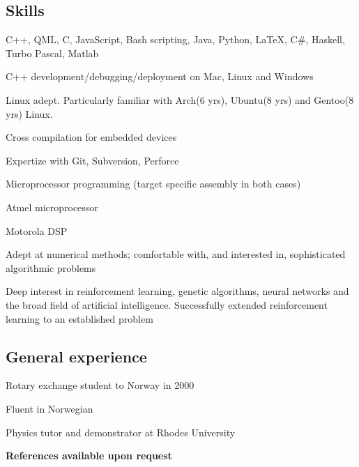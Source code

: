 \documentclass{article}
\begin{document}
\subsection*{Skills}
\begin{itemize*}
\item{ C++, QML, C, JavaScript, Bash scripting, Java, Python, \LaTeX, C\#, Haskell, Turbo Pascal, Matlab}
\item{ C++ development/debugging/deployment on Mac, Linux and Windows}
\item{ Linux adept. Particularly familiar with Arch(6 yrs), Ubuntu(8 yrs) and Gentoo(8 yrs) Linux.}
\item{ Cross compilation for embedded devices}
\item{ Expertize with Git, Subversion, Perforce}
\item{ Microprocessor programming (target specific assembly in both cases) }
\begin{itemize*}
\item{ Atmel microprocessor}
\item{ Motorola DSP}
\end{itemize*}
\item{ Adept at numerical methods; comfortable with, and interested in, sophisticated algorithmic problems}
\item{ Deep interest in reinforcement learning, genetic algorithms, neural networks and the broad field of artificial intelligence. Successfully extended reinforcement learning to an established problem}
\end{itemize*}

\subsection*{General experience}
\begin{itemize*}
\item{	Rotary exchange student to Norway in 2000}
\item{	Fluent in Norwegian}
\item{	Physics tutor and demonstrator at Rhodes University}
\end{itemize*}

\textbf{References available upon request}
 
\end{document}
